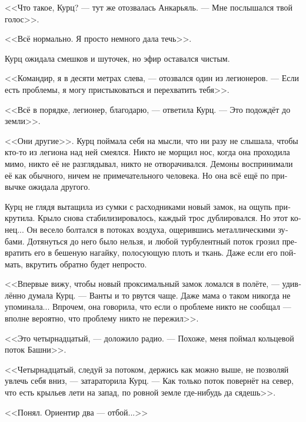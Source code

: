 \documentclass[a4paper,10pt,fleqn]{book}\usepackage{polyglossia}\setdefaultlanguage[babelshorthands=true]{russian}\setotherlanguage{english}\defaultfontfeatures{Ligatures=TeX,Mapping=tex-text}\usepackage{xcolor}\newcommand{\ml}[3]{#2}
\begin{document}
\ml{$0$}
{<<Что такое, Курц? --- тут же отозвалась Анкарьяль.}
{``Whazzup, Kurz?'' Angaralle immediately answered.}
\ml{$0$}
{--- Мне послышался твой голос>>.}
{``I thought I heard your voice.''}

\ml{$0$}
{<<Всё нормально.}
{``I'm all right.}
\ml{$0$}
{Я просто немного дала течь>>.}
{Just sprung a leak.''}

Курц ожидала смешков и шуточек, но эфир оставался чистым.

<<Командир, я в десяти метрах слева, --- отозвался один из легионеров.
--- Если есть проблемы, я могу пристыковаться и перехватить тебя>>.

<<Всё в порядке, легионер, благодарю, --- ответила Курц.
--- Это подождёт до земли>>.

\ml{$0$}
{<<Они другие>>.}
{They're different.}
Курц поймала себя на мысли, что ни разу не слышала, чтобы кто-то из легиона над ней смеялся.
Никто не морщил нос, когда она проходила мимо, никто её не разглядывал, никто не отворачивался.
Демоны воспринимали её как обычного, ничем не примечательного человека.
Но она всё ещё по привычке ожидала другого.

Курц не глядя вытащила из сумки с расходниками новый замок, на ощупь прикрутила.
Крыло снова стабилизировалось, каждый трос дублировался.
Но этот конец...
Он весело болтался в потоках воздуха, ощерившись металлическими зубами.
Дотянуться до него было нельзя, и любой турбулентный поток грозил превратить его в бешеную нагайку, полосующую плоть и ткань.
Даже если его поймать, вкрутить обратно будет непросто.

<<Впервые вижу, чтобы новый проксимальный замок ломался в полёте, --- удивлённо думала Курц.
--- Ванты и то рвутся чаще.
Даже мама о таком никогда не упоминала...
\ml{$0$}
{Впрочем, она говорила, что если о проблеме никто не сообщал --- вполне вероятно, что проблему никто не пережил>>.}
{\textit{She told, however, if the problem were not reported, the problem more than likely were not outlived.}}

<<Это четырнадцатый, --- доложило радио.
--- Похоже, меня поймал кольцевой поток Башни>>.

<<Четырнадцатый, следуй за потоком, держись как можно выше, не позволяй увлечь себя вниз, --- затараторила Курц.
--- Как только поток повернёт на север, что есть крыльев лети на запад, по ровной земле где-нибудь да сядешь>>.

\ml{$0$}
{<<Понял.}
{``Roger that.}
\ml{$0$}
{Ориентир два --- отбой...>>}
{Beacon two is off---''}
\end{document}
